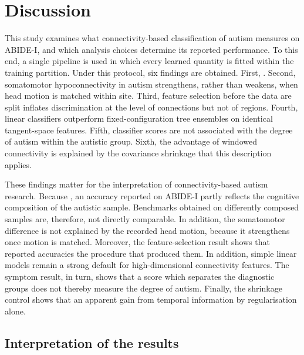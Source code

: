 \section{Discussion}
\label{sec:discussion}

This study examines what connectivity-based classification of autism measures on ABIDE-I,
and which analysis choices determine its reported performance. To this end, a single
pipeline is used in which every learned quantity is fitted within the training partition.
Under this protocol, six findings are obtained. First, . Second, somatomotor hypoconnectivity in autism strengthens,
rather than weakens, when head motion is matched within site. Third, feature selection before
the data are split inflates discrimination at the level of connections but not of regions.
Fourth, linear classifiers outperform fixed-configuration tree ensembles on identical
tangent-space features. Fifth, classifier scores are not associated with the degree of autism
within the autistic group. Sixth, the advantage of windowed connectivity is explained by the
covariance shrinkage that this description applies.

These findings matter for the interpretation of connectivity-based autism research. Because
, an accuracy reported on ABIDE-I partly reflects the
cognitive composition of the autistic sample. Benchmarks obtained on differently composed
samples are, therefore, not directly comparable. In addition, the somatomotor difference is
not explained by the recorded head motion, because it strengthens once motion is matched.
 Moreover, the
feature-selection result shows that reported accuracies  the
procedure that produced them. In addition, simple linear models remain a strong default for
high-dimensional connectivity features. The symptom result, in turn, shows that a score which
separates the diagnostic groups does not thereby measure the degree of autism. Finally, the
shrinkage control shows that an apparent gain from temporal information  by
regularisation alone.

\subsection{Interpretation of the results}
\label{subsec:discussion-results}

